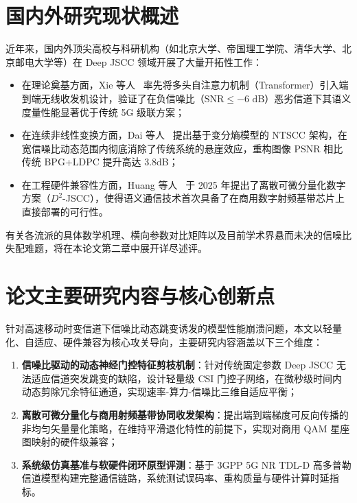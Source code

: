 \section{国内外研究现状概述}
近年来，国内外顶尖高校与科研机构（如北京大学、帝国理工学院、清华大学、北京邮电大学等）在 Deep JSCC 领域开展了大量开拓性工作：
\begin{itemize}
  \item 在理论奠基方面，Xie 等人~\cite{xie2021deep} 率先将多头自注意力机制（Transformer）引入端到端无线收发机设计，验证了在负信噪比（$\text{SNR} \le -6\text{ dB}$）恶劣信道下其语义度量性能显著优于传统 5G 级联方案；
  \item 在连续非线性变换方面，Dai 等人~\cite{dai2022nonlinear} 提出基于变分熵模型的 NTSCC 架构，在宽信噪比动态范围内彻底消除了传统系统的悬崖效应，重构图像 PSNR 相比传统 BPG+LDPC 提升高达 3.8dB；
  \item 在工程硬件兼容性方面，Huang 等人~\cite{huang2025d2} 于 2025 年提出了离散可微分量化数字方案（$D^2$-JSCC），使得语义通信技术首次具备了在商用数字射频基带芯片上直接部署的可行性。
\end{itemize}

有关各流派的具体数学机理、横向参数对比矩阵以及目前学术界悬而未决的信噪比失配难题，将在本论文第二章中展开详尽述评。

\section{论文主要研究内容与核心创新点}
针对高速移动时变信道下信噪比动态跳变诱发的模型性能崩溃问题，本文以轻量化、自适应、硬件兼容为核心攻关导向，主要研究内容涵盖以下三个维度：
\begin{enumerate}
  \item \textbf{信噪比驱动的动态神经门控特征剪枝机制}：针对传统固定参数 Deep JSCC 无法适应信道突发跳变的缺陷，设计轻量级 CSI 门控子网络，在微秒级时间内动态剪除冗余特征通道，实现速率-算力-信噪比三维自适应平衡；
  \item \textbf{离散可微分量化与商用射频基带协同收发架构}：提出端到端梯度可反向传播的非均匀矢量量化策略，在维持平滑退化特性的前提下，实现对商用 QAM 星座图映射的硬件级兼容；
  \item \textbf{系统级仿真基准与软硬件闭环原型评测}：基于 3GPP 5G NR TDL-D 高多普勒信道模型构建完整通信链路，系统测试误码率、重构质量与硬件计算时延指标。
\end{enumerate}

